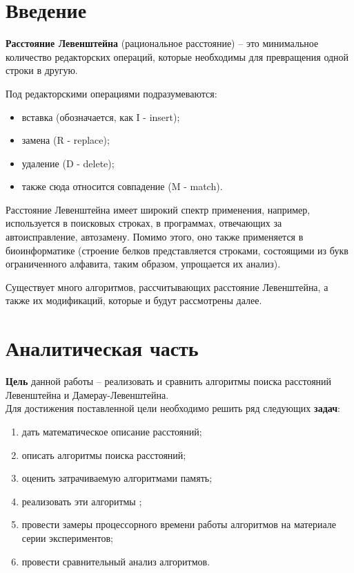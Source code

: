 \documentclass[12pt]{report}
\begin{document}
\tableofcontents

\newpage
\chapter*{Введение}

\textbf{Расстояние Левенштейна}  (рациональное расстояние) – это минимальное количество редакторских операций, которые необходимы для превращения одной строки в другую. 

Под редакторскими операциями подразумеваются:
\begin{itemize}
\item вставка (обозначается, как I - insert);
\item замена (R - replace);
\item удаление (D - delete);
\item также сюда относится совпадение (M - match).
\end{itemize}

Расстояние Левенштейна имеет широкий спектр применения, например, используется в поисковых строках, в программах, отвечающих за автоисправление, автозамену. Помимо этого, оно также применяется в биоинформатике (строение белков представляется строками, состоящими из букв ограниченного алфавита, таким образом, упрощается их анализ).

Существует много алгоритмов, рассчитывающих расстояние Левенштейна, а также их модификаций, которые и будут рассмотрены далее.


\chapter{Аналитическая часть}
\textbf{Цель} данной работы – реализовать и сравнить алгоритмы поиска расстояний Левенштейна и Дамерау-Левенштейна.\\

Для достижения поставленной цели необходимо решить ряд следующих \textbf{задач}:
\begin{enumerate}
\item дать математическое описание расстояний;
\item описать алгоритмы поиска расстояний;
\item оценить затрачиваемую алгоритмами память;
\item реализовать эти алгоритмы ;
\item провести замеры процессорного времени работы алгоритмов на материале серии экспериментов;
\item провести сравнительный анализ алгоритмов.
\end{enumerate}
\end{document}
